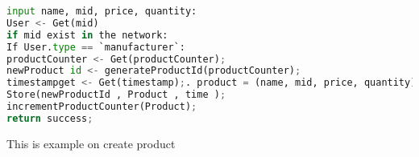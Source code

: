 \begin{lstlisting}[language=Python , caption=Create product]
input name, mid, price, quantity:
User <- Get(mid)
if mid exist in the network:
If User.type == `manufacturer`:
productCounter <- Get(productCounter);
newProduct id <- generateProductId(productCounter);
timestampget <- Get(timestamp);. product = (name, mid, price, quantity);
Store(newProductId , Product , time );
incrementProductCounter(Product);
return success;       
\end{lstlisting}
    This is example on create product